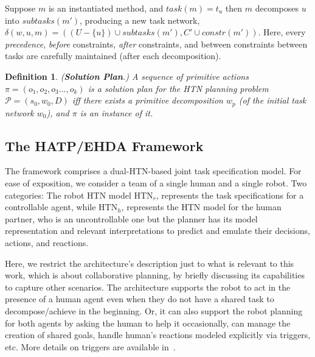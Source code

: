 \documentclass[letterpaper]{article} %
\newtheorem{definition}{Definition}
\begin{document}
Suppose $m$ is an instantiated method, and $task(m)=t_u$ then $m$ decomposes $u$ into $subtasks(m')$, producing a new task network, $\delta(w,u,m)=((U-\{u\})\cup subtasks(m'),C'\cup constr(m'))$.
Here, every \textit{precedence}, \textit{before} constraints, \textit{after} constraints, and between constraints between tasks are carefully maintained (after each decomposition).

\begin{definition} 
(\textbf{Solution Plan}.) 
{A sequence of primitive actions $\pi=(o_1,o_2,o_3...,o_k)$ is a solution plan for the HTN planning problem $\mathcal{P}=(s_0,w_0,D)$ iff there exists a primitive decomposition $w_p$ (of the initial task network $w_0$), and $\pi$ is an instance of it. 
}  
\label{def:htn-sol-plan}
\end{definition}

\subsection{The HATP/EHDA Framework}
The framework comprises a dual-HTN-based joint task specification model.   
For ease of exposition, we consider a team of a single human and a single robot. Two categories: The robot HTN model $\mathrm{HTN}_{r}$, represents the task specifications for a controllable agent, while $\mathrm{HTN}_{h}$, represents the HTN model for the human partner, who is an uncontrollable one but the planner has its model
representation and relevant interpretations to predict and emulate their decisions, actions, and reactions. 


Here, we restrict the architecture's description just to what is relevant to this work, which is about collaborative planning, by briefly discussing its capabilities to capture other scenarios. The architecture supports the robot to act in the presence of a human agent even when they do not have a shared task to decompose/achieve in the beginning. Or, it can also support the robot planning for both agents by asking the human to help it occasionally, can manage the creation of shared goals, handle human's reactions modeled explicitly via triggers, etc. More details on triggers are available in~\cite{ingrand1996prs,AlamiCFGI98}.   
\end{document}
